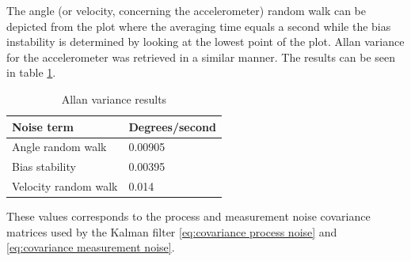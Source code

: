 \documentclass[a4paper,11pt]{kth-mag}
\begin{document}
The angle (or velocity, concerning the accelerometer) random walk can be depicted from the plot where the averaging time equals a second while the bias instability is determined by looking at the lowest point of the plot. Allan variance for the accelerometer was retrieved in a similar manner.  The results can be seen in table \ref{Table: Allan variance}.

\begin{table} [!hbt]
\centering
\begin{tabular}{@{}ll@{}} \toprule
Noise term & Degrees/second\\ \midrule
Angle random walk  	 & 0.00905\\
Bias stability   & 0.00395\\
Velocity random walk  	 & 0.014\\
\bottomrule
 \end{tabular}
 \caption{Allan variance results }
  \label{Table: Allan variance}
\end{table}




These values corresponds to the process and measurement noise covariance matrices used by the Kalman filter \ref{eq:covariance process noise} and \ref{eq:covariance measurement noise}.



%
%
\end{document}
